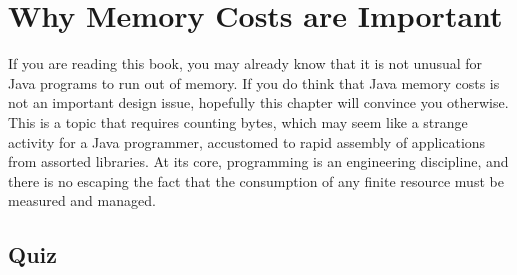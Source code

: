 \chapter{Why Memory Costs are Important}

If you are reading this book, you may already know that it is not unusual for Java programs to run out of memory. If you do think that Java memory costs is not an important design issue, hopefully this chapter will convince you otherwise. This is a topic that requires counting bytes, which may seem like a strange activity for a Java programmer, accustomed to rapid assembly of applications from assorted libraries. At its core, programming is an engineering discipline, and there is no escaping the fact that the consumption of any finite resource must be measured and managed. 

\section{Quiz}

